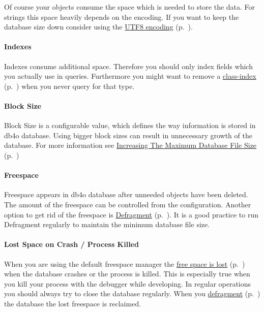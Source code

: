 Of course your objects consume the space which is needed to store the data. For strings this space heavily depends on the encoding. If you want to keep the database size down consider using the \hyperref[ref:configuration-common-string-encoding]{UTF8 encoding} (p.~\pageref{ref:configuration-common-string-encoding}).

\paragraph*{Indexes}

Indexes consume additional space. Therefore you should only index fields which you actually use in queries. Furthermore you might want to remove a \hyperref[ref:configuration-objectclass-diable-class-index]{class-index} (p.~\pageref{ref:configuration-objectclass-diable-class-index}) when you never query for that type.

\paragraph*{Block Size}

Block Size is a configurable value, which defines the way information is stored in db4o database. Using bigger block sizes can result in unnecessary growth of the database. For more information see \hyperref[ref:troubleshoot-increasing-the-maximum-database-file-size]{Increasing The Maximum Database File Size} (p.~\pageref{ref:troubleshoot-increasing-the-maximum-database-file-size})

\paragraph*{Freespace}

Freespace appears in db4o database after unneeded objects have been deleted. The amount of the freespace can be controlled from the configuration. Another option to get rid of the freespace is \hyperref[ref:advanced-topics-defragment]{Defragment} (p.~\pageref{ref:advanced-topics-defragment}). It is a good practice to run Defragment regularly to maintain the minimum database file size.

\paragraph*{Lost Space on Crash / Process Killed}

When you are using the default freespace manager the \hyperref[ref:configuration-file-freespace-configuration]{free space is lost} (p.~\pageref{ref:configuration-file-freespace-configuration}) when the database crashes or the process is killed. This is especially true when you kill your process with the debugger while developing. In regular operations you should always try to close the database regularly. When you \hyperref[ref:advanced-topics-defragment]{defragment} (p.~\pageref{ref:advanced-topics-defragment}) the database the lost freespace is reclaimed.


